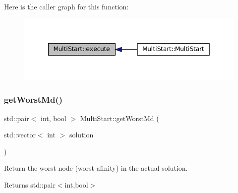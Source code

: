 Here is the caller graph for this function\+:
\nopagebreak
\begin{figure}[H]
\begin{center}
\leavevmode
\includegraphics[width=342pt]{classMultiStart_a9d842b1f602c4b8a47bf6d88d483ccae_icgraph}
\end{center}
\end{figure}
\mbox{\label{classMultiStart_a0ad5ed40a5c4ab964cb27f79343eed98}} 
\subsubsection{\texorpdfstring{get\+Worst\+Md()}{getWorstMd()}}
{\footnotesize\ttfamily std\+::pair$<$ int, bool $>$ Multi\+Start\+::get\+Worst\+Md (\begin{DoxyParamCaption}\item[{std\+::vector$<$ int $>$}]{solution }\end{DoxyParamCaption})}



Return the worst node (worst afinity) in the actual solution. 

\begin{DoxyReturn}{Returns}
std\+::pair$<$int,bool$>$ 
\end{DoxyReturn}

